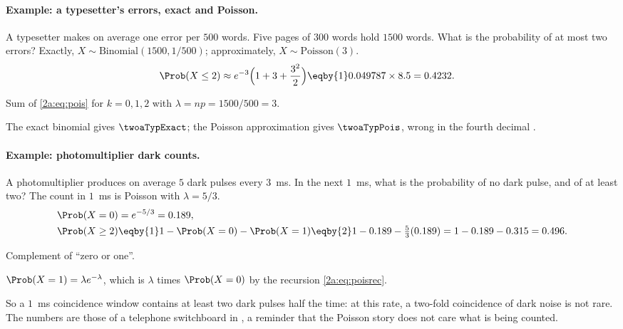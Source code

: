 \paragraph{Example: a typesetter's errors, exact and Poisson.}
A typesetter makes on average one error per $500$ words. Five pages of $300$ words hold $1500$ words. What is the probability of at most two errors? Exactly, $X\sim\mathrm{Binomial}(1500,1/500)$; approximately, $X\sim\mathrm{Poisson}(3)$.
\begin{align*}
  \Prob(X\le2) &\approx e^{-3}\Bigl(1+3+\frac{3^2}{2}\Bigr) \eqby{1} 0.049787\times8.5 = 0.4232 .
\end{align*}
\begin{explain}
  \item Sum of \eqref{2a:eq:pois} for $k=0,1,2$ with $\lambda=np=1500/500=3$.
\end{explain}
The exact binomial gives $\twoaTypExact$; the Poisson approximation gives $\twoaTypPois$, wrong in the fourth decimal .

\paragraph{Example: photomultiplier dark counts.}
A photomultiplier produces on average $5$ dark pulses every $3$~ms. In the next $1$~ms, what is the probability of no dark pulse, and of at least two? The count in $1$~ms is Poisson with $\lambda=5/3$.
\begin{align*}
  \Prob(X=0) &= e^{-5/3} = 0.189,\\
  \Prob(X\ge2) &\eqby{1} 1-\Prob(X=0)-\Prob(X=1) \eqby{2} 1-0.189-\tfrac53(0.189) = 1-0.189-0.315 = 0.496 .
\end{align*}
\begin{explain}
  \item Complement of ``zero or one''.
  \item $\Prob(X=1)=\lambda e^{-\lambda}$, which is $\lambda$ times $\Prob(X=0)$ by the recursion \eqref{2a:eq:poisrec}.
\end{explain}
So a $1$~ms coincidence window contains at least two dark pulses half the time: at this rate, a two-fold coincidence of dark noise is not rare. The numbers are those of a telephone switchboard in , a reminder that the Poisson story does not care what is being counted.

